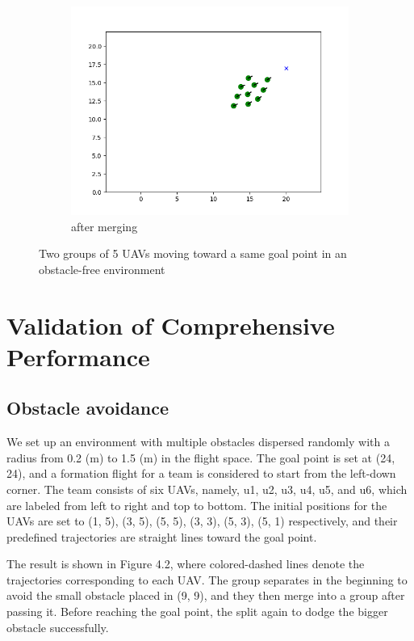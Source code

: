 \begin{figure}
\begin{subfigure}[b]{0.3\textwidth}
         \centering
         \includegraphics[width=\textwidth]{figures/merge_3.png}
         \caption{after merging}
         \label{fig:five over x}
     \end{subfigure}
        \caption{Two groups of 5 UAVs moving toward a same goal point in an obstacle-free environment}
        \label{fig:three graphs}
\end{figure}

\section{Validation of Comprehensive Performance}
\subsection{Obstacle avoidance}
We set up an environment with multiple obstacles dispersed randomly with a radius from 0.2 (m) to 1.5 (m) in the flight space. The goal point is set at (24, 24), and a formation flight for a team is considered to start from the left-down corner. The team consists of six UAVs, namely, u1, u2, u3, u4, u5, and u6, which are labeled from left to right and top to bottom. The initial positions for the UAVs are set to (1, 5), (3, 5), (5, 5), (3, 3), (5, 3), (5, 1) respectively, and their predefined trajectories are straight lines toward the goal point.

The result is shown in Figure 4.2, where colored-dashed lines denote the trajectories corresponding to each UAV. The group separates in the beginning to avoid the small obstacle placed in (9, 9), and they then merge into a group after passing it. Before reaching the goal point, the split again to dodge the bigger obstacle successfully.

